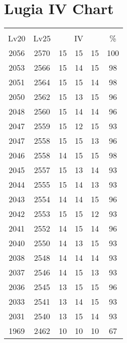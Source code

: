 \documentclass{article}%
\begin{document}
%
\normalsize%
\section{Lugia IV Chart}%
\label{sec:Lugia IV Chart}%
\renewcommand{\arraystretch}{1.5}%
\begin{tabular}{|c|c|c|c|c|c|}%
\hline%
\multicolumn{6}{|c|}{\textcolor{white}{ 
\linebreak{Lugia}
}%
\cellcolor{black}}\\%
\multicolumn{1}{|c}{Lv20}&\multicolumn{1}{c|}{Lv25}&\multicolumn{3}{c|}{IV}&\multicolumn{1}{|c|}{\%}\\%
\hline%
\rowcolor{color100}%
2056&2570&15&15&15&100\\%
\hline%
\rowcolor{color98}%
2053&2566&15&14&15&98\\%
\hline%
\rowcolor{color98}%
2051&2564&15&15&14&98\\%
\hline%
\rowcolor{color96}%
2050&2562&15&13&15&96\\%
\hline%
\rowcolor{color96}%
2048&2560&15&14&14&96\\%
\hline%
\rowcolor{color93}%
2047&2559&15&12&15&93\\%
\hline%
\rowcolor{color96}%
2047&2558&15&15&13&96\\%
\hline%
\rowcolor{color98}%
2046&2558&14&15&15&98\\%
\hline%
\rowcolor{color93}%
2045&2557&15&13&14&93\\%
\hline%
\rowcolor{color93}%
2044&2555&15&14&13&93\\%
\hline%
\rowcolor{color96}%
2043&2554&14&14&15&96\\%
\hline%
\rowcolor{color93}%
2042&2553&15&15&12&93\\%
\hline%
\rowcolor{color96}%
2041&2552&14&15&14&96\\%
\hline%
\rowcolor{color93}%
2040&2550&14&13&15&93\\%
\hline%
\rowcolor{color93}%
2038&2548&14&14&14&93\\%
\hline%
\rowcolor{color93}%
2037&2546&14&15&13&93\\%
\hline%
\rowcolor{color96}%
2036&2545&13&15&15&96\\%
\hline%
\rowcolor{color93}%
2033&2541&13&14&15&93\\%
\hline%
\rowcolor{color93}%
2031&2540&13&15&14&93\\%
\hline%
\rowcolor{color91}%
1969&2462&10&10&10&67\\%
\end{tabular}

%
\end{document}
